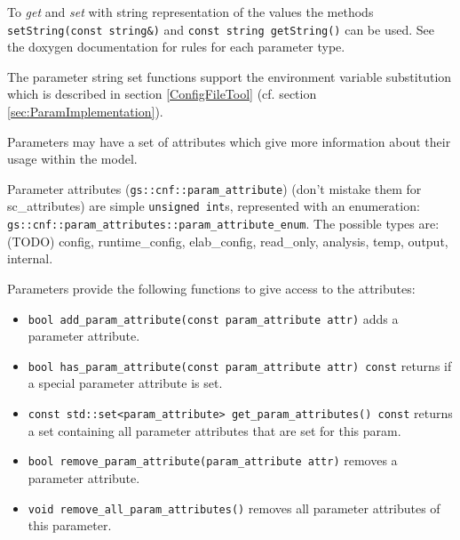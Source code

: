 
To {\em get} and {\em set} with string representation of the values the methods \lstinline|setString(const string&)| and \lstinline|const string getString()| can be used. See the doxygen documentation for rules for each parameter type.

The parameter string set functions support the environment variable substitution which is described in section \ref{ConfigFileTool} (cf. section \ref{sec:ParamImplementation}).


Parameters may have a set of attributes which give more information about their usage within the model.

Parameter attributes (\lstinline|gs::cnf::param_attribute|) (don't mistake them for {\sffamily sc\_attributes}) are simple \lstinline|unsigned int|s, represented with an enumeration: \lstinline|gs::cnf::param_attributes::param_attribute_enum|. The possible types are: (TODO) {\sffamily config, runtime\_config, elab\_config, read\_only, analysis, temp, output, internal}.

Parameters provide the following functions to give access to the attributes:
\begin{itemize}
	\item \lstinline|bool add_param_attribute(const param_attribute attr)|  \newline
	adds a parameter attribute.

	\item \lstinline|bool has_param_attribute(const param_attribute attr) const| \newline
	 returns if a special parameter attribute is set.

	\item \lstinline|const std::set<param_attribute> get_param_attributes() const|  \newline
	returns a set containing all parameter attributes that are set for this param.

	\item \lstinline|bool remove_param_attribute(param_attribute attr)|  \newline
	removes a parameter attribute.

	\item \lstinline|void remove_all_param_attributes()|  \newline
	removes all parameter attributes of this parameter.
\end{itemize}

